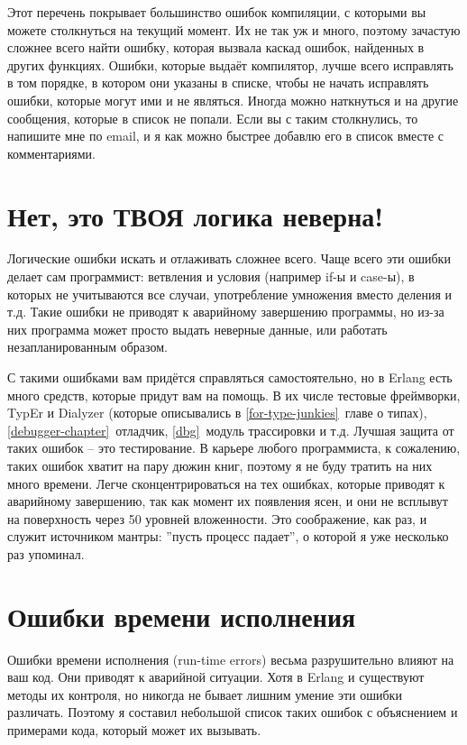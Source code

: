 Этот перечень покрывает большинство ошибок компиляции, с которыми вы можете столкнуться на текущий момент. Их не так уж и много, поэтому зачастую сложнее всего найти ошибку, которая вызвала каскад ошибок, найденных в других функциях.
Ошибки, которые выдаёт компилятор, лучше всего исправлять в том порядке, в котором они указаны в списке, чтобы не начать исправлять ошибки, которые могут ими и не являться.
Иногда можно наткнуться и на другие сообщения, которые в список не попали.
Если вы с таким столкнулись, то напишите мне по email, и я как можно быстрее добавлю его в список вместе с комментариями.
\section{Нет, это ТВОЯ логика неверна!}
\label{no-your-logic-is-wrong}
Логические ошибки искать и отлаживать сложнее всего. Чаще всего эти ошибки делает сам программист: ветвления и условия (например if\--ы и case\--ы), в которых не учитываются все случаи, употребление умножения вместо деления и т.д.
Такие ошибки не приводят к аварийному завершению программы, но из\--за них программа может просто выдать неверные данные, или работать незапланированным образом.

С такими ошибками вам придётся справляться самостоятельно, но в Erlang есть много средств, которые придут вам на помощь.
В их числе тестовые фреймворки, TypEr и Dialyzer (которые описывались в \ref{for-type-junkies}~главе о типах), \ref{debugger-chapter}~отладчик, \ref{dbg}~модуль трассировки и т.д.
Лучшая защита от таких ошибок \--- это тестирование.
В карьере любого программиста, к сожалению, таких ошибок хватит на пару дюжин книг, поэтому я не буду тратить на них много времени.
Легче сконцентрироваться на тех ошибках, которые приводят к аварийному завершению, так как момент их появления ясен, и они не всплывут на поверхность через 50 уровней вложенности.
Это соображение, как раз, и служит источником мантры: ''пусть процесс падает'', о которой я уже несколько раз упоминал.
\section{Ошибки времени исполнения}
\label{run-time-errors}
Ошибки времени исполнения (run\--time errors) весьма разрушительно влияют на ваш код. Они приводят к аварийной ситуации.
Хотя в Erlang и существуют методы их контроля, но никогда не бывает лишним умение эти ошибки различать.
Поэтому я составил небольшой список таких ошибок с объяснением и примерами кода, который может их вызывать.

